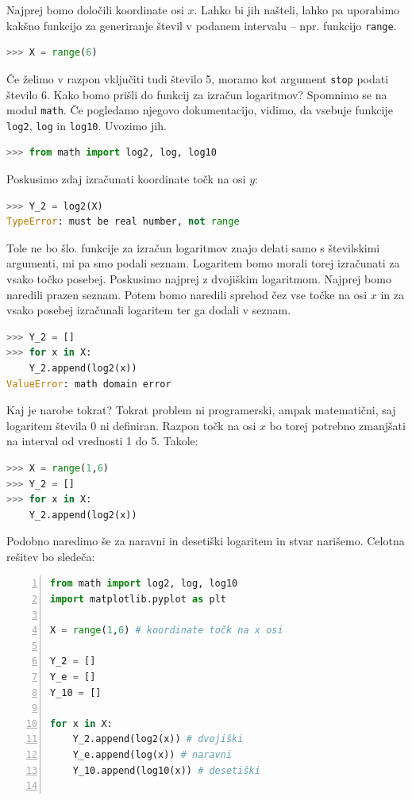 \begin{resitev}
Najprej bomo določili koordinate osi $x$. Lahko bi jih našteli, lahko pa uporabimo kakšno funkcijo za generiranje števil v podanem intervalu -- npr. funkcijo \texttt{range}.
\begin{lstlisting}[language=Python]
>>> X = range(6)
\end{lstlisting}
Če želimo v razpon vključiti tudi število 5, moramo kot argument \texttt{stop} podati število 6. Kako bomo prišli do funkcij za izračun logaritmov? Spomnimo se na modul \texttt{math}. Če pogledamo njegovo dokumentacijo, vidimo, da vsebuje funkcije \texttt{log2}, \texttt{log} in \texttt{log10}. Uvozimo jih. 
\begin{lstlisting}[language=Python]
>>> from math import log2, log, log10
\end{lstlisting}
Poskusimo zdaj izračunati koordinate točk na osi $y$:
\begin{lstlisting}[language=Python]
>>> Y_2 = log2(X)
TypeError: must be real number, not range
\end{lstlisting}
Tole ne bo šlo. funkcije za izračun logaritmov znajo delati samo s številskimi argumenti, mi pa smo podali seznam. Logaritem bomo morali torej izračunati za vsako točko posebej. Poskusimo najprej z dvojiškim logaritmom. Najprej bomo naredili prazen seznam. Potem bomo naredili sprehod čez vse točke na osi $x$ in za vsako posebej izračunali logaritem ter ga dodali v seznam.
\begin{lstlisting}[language=Python]
>>> Y_2 = []
>>> for x in X:
    Y_2.append(log2(x))
ValueError: math domain error
\end{lstlisting}
Kaj je narobe tokrat? Tokrat problem ni programerski, ampak matematični, saj logaritem števila 0 ni definiran. Razpon točk na osi $x$ bo torej potrebno zmanjšati na interval od vrednosti 1 do 5. Takole:
\begin{lstlisting}[language=Python]
>>> X = range(1,6)
>>> Y_2 = []
>>> for x in X:
    Y_2.append(log2(x))
\end{lstlisting}
Podobno naredimo še za naravni in desetiški logaritem in stvar narišemo. Celotna rešitev bo sledeča:
\begin{lstlisting}[language=Python,numbers=left,escapechar=~]
from math import log2, log, log10
import matplotlib.pyplot as plt

X = range(1,6) # koordinate točk na x osi

Y_2 = []
Y_e = []
Y_10 = []

for x in X:
    Y_2.append(log2(x)) # dvojiški
    Y_e.append(log(x)) # naravni
    Y_10.append(log10(x)) # desetiški


\end{lstlisting}
\end{resitev}
